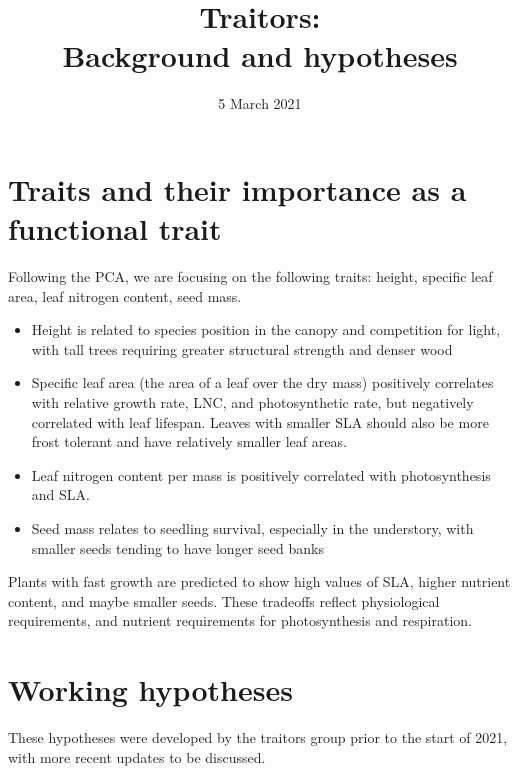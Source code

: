 \documentclass{article}\usepackage[]{graphicx}\usepackage[]{color}
\begin{document}
\title{{\huge Traitors:} \\ Background and hypotheses}
\date{5 March 2021}
\maketitle 

\section{Traits and their importance as a functional trait}

Following the PCA, we are focusing on the following traits: height, specific leaf area, leaf nitrogen content, seed mass. 
\begin{itemize}
\item Height is related to species position in the canopy and competition for light, with tall trees requiring greater structural strength and denser wood
\item Specific leaf area (the area of a leaf over the dry mass) positively correlates with relative growth rate, LNC, and photosynthetic rate, but negatively correlated with leaf lifespan. Leaves with smaller SLA should also be more frost tolerant and have relatively smaller leaf areas.
\item Leaf nitrogen content per mass is positively correlated with photosynthesis and SLA. 
\item Seed mass relates to seedling survival, especially in the understory, with smaller seeds tending to have longer seed banks
\end{itemize}

Plants with fast growth are predicted to show high values of SLA, higher nutrient content, and maybe smaller seeds. These tradeoffs reflect physiological requirements, and nutrient requirements for photosynthesis and respiration. 

\section{Working hypotheses}

These hypotheses were developed by the traitors group prior to the start of 2021, with more recent updates to be discussed. 
\end{document}
